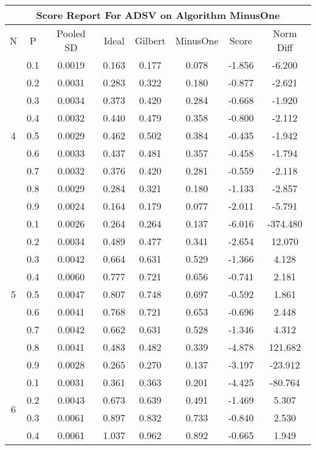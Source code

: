 \documentclass[11pt,a4paper]{report}
\begin{document}
\begin{longtable}{ | c | c || c | c | c | c | c | c | }
\hline
\multicolumn{8}{|c|}{ Score Report For ADSV on Algorithm MinusOne} \\
\hline
N & P & Pooled SD &  Ideal &  Gilbert & MinusOne  & Score & Norm Diff \\
 \hline
 \hline
 \endhead
\multirow{9}{*}{4} & 0.1 & 0.0019 & 0.163 & 0.177 & 0.078 & -1.856 & -6.200 \\
 & 0.2 & 0.0031 & 0.283 & 0.322 & 0.180 & -0.877 & -2.621 \\
 & 0.3 & 0.0034 & 0.373 & 0.420 & 0.284 & -0.668 & -1.920 \\
 & 0.4 & 0.0032 & 0.440 & 0.479 & 0.358 & -0.800 & -2.112 \\
 & 0.5 & 0.0029 & 0.462 & 0.502 & 0.384 & -0.435 & -1.942 \\
 & 0.6 & 0.0033 & 0.437 & 0.481 & 0.357 & -0.458 & -1.794 \\
 & 0.7 & 0.0032 & 0.376 & 0.420 & 0.281 & -0.559 & -2.118 \\
 & 0.8 & 0.0029 & 0.284 & 0.321 & 0.180 & -1.133 & -2.857 \\
 & 0.9 & 0.0024 & 0.164 & 0.179 & 0.077 & -2.011 & -5.791 \\
 \hline
\multirow{9}{*}{5} & 0.1 & 0.0026 & 0.264 & 0.264 & 0.137 & -6.016 & -374.480 \\
 & 0.2 & 0.0034 & 0.489 & 0.477 & 0.341 & -2.654 & 12.070 \\
 & 0.3 & 0.0042 & 0.664 & 0.631 & 0.529 & -1.366 & 4.128 \\
 & 0.4 & 0.0060 & 0.777 & 0.721 & 0.656 & -0.741 & 2.181 \\
 & 0.5 & 0.0047 & 0.807 & 0.748 & 0.697 & -0.592 & 1.861 \\
 & 0.6 & 0.0041 & 0.768 & 0.721 & 0.653 & -0.696 & 2.448 \\
 & 0.7 & 0.0042 & 0.662 & 0.631 & 0.528 & -1.346 & 4.312 \\
 & 0.8 & 0.0041 & 0.483 & 0.482 & 0.339 & -4.878 & 121.682 \\
 & 0.9 & 0.0028 & 0.265 & 0.270 & 0.137 & -3.197 & -23.912 \\
 \hline
\multirow{9}{*}{6} & 0.1 & 0.0031 & 0.361 & 0.363 & 0.201 & -4.425 & -80.764 \\
 & 0.2 & 0.0043 & 0.673 & 0.639 & 0.491 & -1.469 & 5.307 \\
 & 0.3 & 0.0061 & 0.897 & 0.832 & 0.733 & -0.840 & 2.530 \\
 & 0.4 & 0.0061 & 1.037 & 0.962 & 0.892 & -0.665 & 1.949 \\

\end{longtable}
\end{document}
